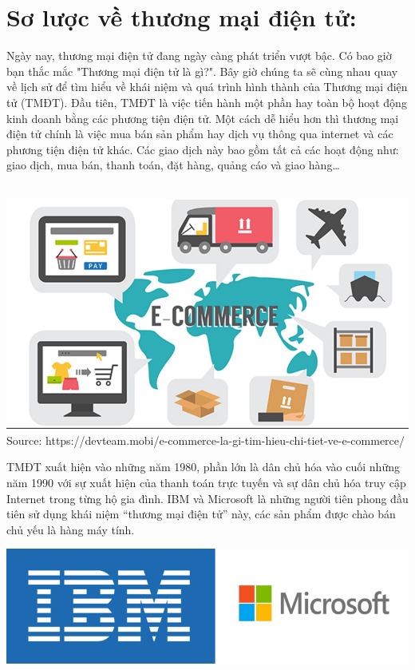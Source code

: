 \documentclass[13pt,a4paper]{article}
\begin{document}
\section{Sơ lược về thương mại điện tử:}
\fontsize{13pt}{1.2pt}\selectfont %
 Ngày nay, thương mại điện tử đang ngày càng phát triển vượt bậc. Có bao giờ bạn thắc mắc "Thương mại điện tử là gì?". Bây giờ chúng ta sẽ cùng nhau quay về lịch sử để tìm hiểu về khái niệm và quá trình hình thành của Thương mại điện tử (TMĐT). Đầu tiên, TMĐT là việc tiến hành một phần hay toàn bộ hoạt động kinh doanh bằng các phương tiện điện tử. Một cách dễ hiểu hơn thì thương mại điện tử chính là việc mua bán sản phẩm hay dịch vụ thông qua internet và các phương tiện điện tử khác. Các giao dịch này bao gồm tất cả các hoạt động như: giao dịch, mua bán, thanh toán, đặt hàng, quảng cáo và giao hàng… \\ \\
\begin{center}
\includegraphics[scale=0.5]{images/e-com.png}\\
\fontsize{10pt}{1.2pt}\selectfont
    Source: https://devteam.mobi/e-commerce-la-gi-tim-hieu-chi-tiet-ve-e-commerce/
\\
\end{center}
TMĐT xuất hiện vào những năm 1980, phần lớn là dân chủ hóa vào cuối những năm 1990 với sự xuất hiện của thanh toán trực tuyến và sự dân chủ hóa truy cập Internet trong từng hộ gia đình.
IBM và Microsoft là những người tiên phong đầu tiên sử dụng khái niệm “thương mại điện tử” này, các sản phẩm được chào bán chủ yếu là hàng máy tính.
\begin{center}
\includegraphics[scale=0.5]{images/IBM.png}\\
\end{center}
\end{document}
